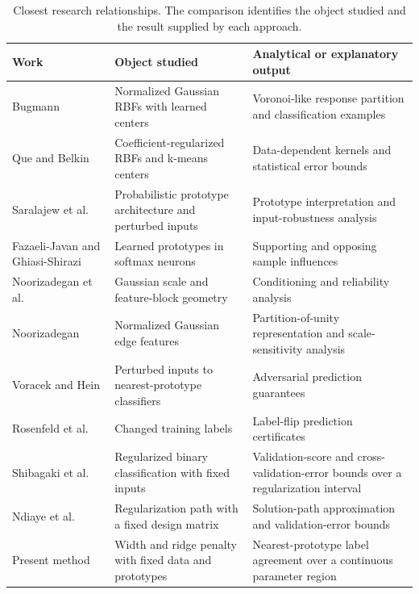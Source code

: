 \documentclass[preprint,12pt]{elsarticle}
\begin{document}
\begin{table}[!htbp]
\centering\small
\caption{Closest research relationships. The comparison identifies the object studied and the result supplied by each approach.}
\label{tab:prior}
\begin{tabularx}{\textwidth}{@{}>{\raggedright\arraybackslash}p{}>{\raggedright\arraybackslash}X>{\raggedright\arraybackslash}X@{}}
\toprule
Work & Object studied & Analytical or explanatory output \\
\midrule
Bugmann \citep{bugmann1998} & Normalized Gaussian RBFs with learned centers & Voronoi-like response partition and classification examples \\
Que and Belkin \citep{que2016} & Coefficient-regularized RBFs and k-means centers & Data-dependent kernels and statistical error bounds \\
Saralajew et al.\ \citep{saralajew2025} & Probabilistic prototype architecture and perturbed inputs & Prototype interpretation and input-robustness analysis \\
Fazaeli-Javan and Ghiasi-Shirazi \citep{fazaeli2026} & Learned prototypes in softmax neurons & Supporting and opposing sample influences \\
Noorizadegan et al.\ \citep{noorizadegan2026reliable} & Gaussian scale and feature-block geometry & Conditioning and reliability analysis \\
Noorizadegan \citep{noorizadegan2026partition} & Normalized Gaussian edge features & Partition-of-unity representation and scale-sensitivity analysis \\
Voracek and Hein \citep{voracek2022} & Perturbed inputs to nearest-prototype classifiers & Adversarial prediction guarantees \\
Rosenfeld et al.\ \citep{rosenfeld2020} & Changed training labels & Label-flip prediction certificates \\
Shibagaki et al.\ \citep{shibagaki2015} & Regularized binary classification with fixed inputs & Validation-score and cross-validation-error bounds over a regularization interval \\
Ndiaye et al.\ \citep{ndiaye2019} & Regularization path with a fixed design matrix & Solution-path approximation and validation-error bounds \\
Present method & Width and ridge penalty with fixed data and prototypes & Nearest-prototype label agreement over a continuous parameter region \\
\bottomrule
\end{tabularx}
\end{table}
\end{document}
